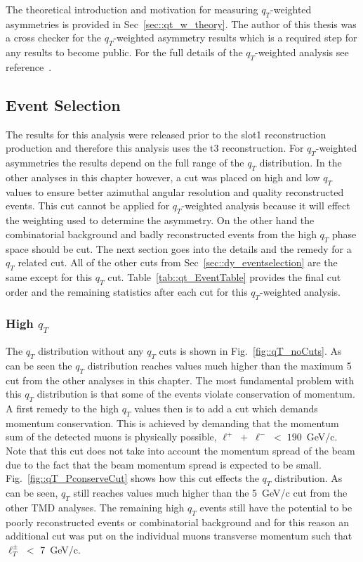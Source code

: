 The theoretical introduction and motivation for measuring $q_T$-weighted
asymmetries is provided in Sec~\ref{sec::qt_w_theory}.  The author of this
thesis was a cross checker for the $q_T$-weighted asymmetry results which is a
required step for any results to become public.  For the full details of the
$q_T$-weighted analysis see reference~\cite{janthesis}.

\subsection{Event Selection}
The results for this analysis were released prior to the slot1 reconstruction
production and therefore this analysis uses the t3 reconstruction.  For
$q_T$-weighted asymmetries the results depend on the full range of the $q_T$
distribution.  In the other analyses in this chapter however, a cut was placed
on high and low $q_T$ values to ensure better azimuthal angular resolution and
quality reconstructed events.  This cut cannot be applied for $q_T$-weighted
analysis because it will effect the weighting used to determine the asymmetry.
On the other hand the combinatorial background and badly reconstructed events
from the high $q_T$ phase space should be cut.  The next section goes into the
details and the remedy for a $q_T$ related cut. All of the other cuts from
Sec~\ref{sec::dy_eventselection} are the same except for this $q_T$
cut. Table~\ref{tab::qt_EventTable} provides the final cut order and the
remaining statistics after each cut for this $q_T$-weighted analysis.

\subsubsection{High $q_T$} \label{sec::high_qt}
The $q_T$ distribution without any $q_T$ cuts is shown in
Fig.~\ref{fig::qT_noCuts}.  As can be seen the $q_T$ distribution reaches values
much higher than the maximum 5~{\gvc} cut from the other analyses in this
chapter.  The most fundamental problem with this $q_T$ distribution is that some
of the events violate conservation of momentum.  A first remedy to the high
$q_T$ values then is to add a cut which demands momentum conservation.  This is
achieved by demanding that the momentum sum of the detected muons is physically
possible, $\ell^+ \; + \; \ell^- \; < \; 190$~GeV/c.  Note that this cut does
not take into account the momentum spread of the beam due to the fact that the
beam momentum spread is expected to be small.  Fig.~\ref{fig::qT_PconserveCut}
shows how this cut effects the $q_T$ distribution.  As can be seen, $q_T$ still
reaches values much higher than the 5~GeV/c cut from the other TMD analyses.
The remaining high $q_T$ events still have the potential to be poorly
reconstructed events or combinatorial background and for this reason an
additional cut was put on the individual muons transverse momentum such that
$\ell_T^{\pm} \; <$ 7~GeV/c.

